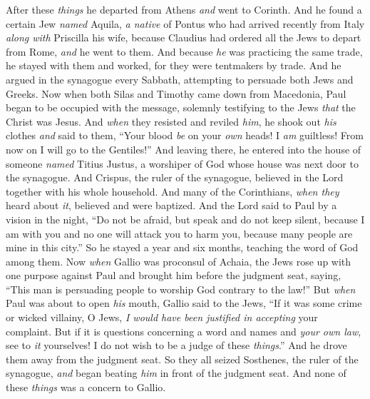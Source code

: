 \begin{biblechapter} %
 After these \textit{things} he departed from Athens \textit{and} went to Corinth.
\verse And he found a certain Jew \textit{named} Aquila, \textit{a native} of Pontus who had arrived recently from Italy \textit{along with} Priscilla his wife, because Claudius had ordered all the Jews to depart from Rome, \textit{and} he went to them.
\verse And because \textit{he} was practicing the same trade, he stayed with them and worked, for they were tentmakers by trade.
\verse And he argued in the synagogue every Sabbath, attempting to persuade both Jews and Greeks.
\verse Now when both Silas and Timothy came down from Macedonia, Paul began to be occupied with the message, solemnly testifying to the Jews \textit{that} the Christ was Jesus.
\verse And \textit{when} they resisted and reviled \textit{him}, he shook out \textit{his} clothes \textit{and} said to them, “Your blood \textit{be} on your \textit{own} heads! I \textit{am} guiltless! From now on I will go to the Gentiles!”
\verse And leaving there, he entered into the house of someone \textit{named} Titius Justus, a worshiper of God whose house was next door to the synagogue.
\verse And Crispus, the ruler of the synagogue, believed in the Lord together with his whole household. And many of the Corinthians, \textit{when they} heard about \textit{it}, believed and were baptized.
\verse And the Lord said to Paul by a vision in the night, “Do not be afraid, but speak and do not keep silent,
\verse because I am with you and no one will attack you to harm you, because many people are mine in this city.”
\verse So he stayed a year and six months, teaching the word of God among them.
 Now \textit{when} Gallio was proconsul of Achaia, the Jews rose up with one purpose against Paul and brought him before the judgment seat,
\verse saying, “This man is persuading people to worship God contrary to the law!”
\verse But \textit{when} Paul was about to open \textit{his} mouth, Gallio said to the Jews, “If it was some crime or wicked villainy, O Jews, \textit{I would have been justified in accepting} your complaint.
\verse But if it is questions concerning a word and names and \textit{your own law}, see to \textit{it} yourselves! I do not wish to be a judge of these \textit{things}.”
\verse And he drove them away from the judgment seat.
\verse So they all seized Sosthenes, the ruler of the synagogue, \textit{and} began beating \textit{him} in front of the judgment seat. And none of these \textit{things} was a concern to Gallio.

\end{biblechapter}
